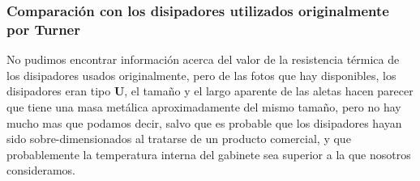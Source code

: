 \subsubsection{Comparación con los disipadores utilizados originalmente por Turner}

No pudimos encontrar información acerca del valor de la resistencia térmica de los disipadores usados originalmente, pero de las fotos que hay disponibles, los disipadores eran tipo \textbf{U}, el tamaño y el largo aparente de las aletas hacen parecer que tiene una masa metálica aproximadamente del mismo tamaño, pero no hay mucho mas que podamos decir, salvo que es probable que los disipadores hayan sido sobre-dimensionados al tratarse de un producto comercial, y que probablemente la temperatura interna del gabinete sea superior a la que nosotros consideramos.




\clearpage
